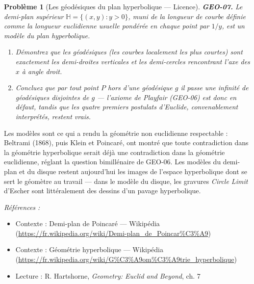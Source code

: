 \documentclass[11pt]{article}
\newtheorem{problem}{Problème}
\newenvironment{refs}{\par\small\noindent\emph{Références :}\begin{itemize}\setlength\itemsep{0pt}}{\end{itemize}\normalsize}
\begin{document}
\begin{problem}[{Les géodésiques du plan hyperbolique --- Licence}]
\textbf{GEO-07.} Le demi-plan supérieur $ \mathbb{H} = \{(x,y) : y > 0\} $, muni de la
longueur de courbe définie comme la longueur euclidienne usuelle pondérée en chaque point par
$ 1/y $, est un modèle du plan hyperbolique.
\begin{enumerate}
\item[(a)] Démontrez que les géodésiques (les courbes localement les plus courtes) sont exactement les
demi-droites verticales et les demi-cercles rencontrant l'axe des $ x $ à angle droit.
\item[(b)] Concluez que par tout point $ P $ hors d'une géodésique $ g $ il passe une infinité de
géodésiques disjointes de $ g $ --- l'axiome de Playfair (GEO-06) est donc en défaut, tandis que
les quatre premiers postulats d'Euclide, convenablement interprétés, restent vrais.
\end{enumerate}

\end{problem}

\noindent Les modèles sont ce qui a rendu la géométrie non euclidienne respectable :
Beltrami (1868), puis Klein et Poincaré, ont montré que toute contradiction dans la géométrie
hyperbolique serait déjà une contradiction dans la géométrie euclidienne, réglant la question
bimillénaire de GEO-06. Les modèles du demi-plan et du disque restent aujourd'hui les images de
l'espace hyperbolique dont se sert le géomètre au travail --- dans le modèle du disque, les gravures
\textit{Circle Limit} d'Escher sont littéralement des dessins d'un pavage hyperbolique.

\begin{refs}
\item Contexte : Demi-plan de Poincaré --- Wikipédia (\url{https://fr.wikipedia.org/wiki/Demi-plan_de_Poincar%C3%A9})
\item Contexte : Géométrie hyperbolique --- Wikipédia (\url{https://fr.wikipedia.org/wiki/G%C3%A9om%C3%A9trie_hyperbolique})
\item Lecture : R. Hartshorne, \textit{Geometry: Euclid and Beyond}, ch. 7
\end{refs}

\bigskip
\end{document}
